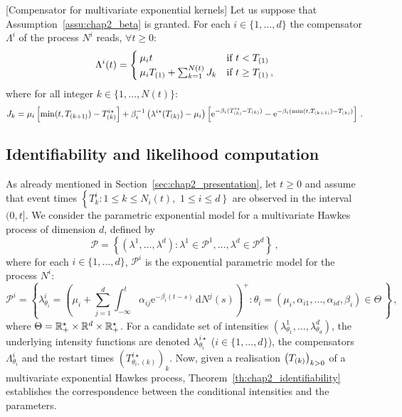    \begin{proposition}\label{prop:chap2_compensator}[Compensator for multivariate exponential kernels]
    Let us suppose that Assumption~\ref{assu:chap2_beta} is granted. For each $i\in\{1,\ldots, d\}$ the compensator $\Lambda^i$ of the process $N^i$ reads, $\forall t\geq 0$:
    \begin{equation}\label{eq:chap2_compensator_exponential}
      \Lambda^i(t) =
      \begin{cases}
        \mu_i t & \text{if } t < T\park[1] \\
        \mu_i T\park[1] + \sum_{k=1}^{N(t)} J_k & \text{if } t \geq T\park[1] \,,
      \end{cases}
    \end{equation}
    where for all integer \(k \in \{1, \dots, N(t)\}\):
    \begin{equation*}
      J_k =
      \mu_i \left[\min(t, T\park[k+1] ) - T\park^{i\star}\right] + \beta_i^{-1} \left(\lambda^{i\star}(T\park) - \mu_i \right)
      \left[ \mathrm{e}^{-\beta_i(T\park^{i\star} - T\park)} - \mathrm{e}^{-\beta_i(\min(t, T\park[k+1])- T\park)} \right]\,.
    \end{equation*}
    \end{proposition}
    
  \subsection{Identifiability and likelihood computation}\label{sec:chap2_likelihood}
    As already mentioned in Section~\ref{sec:chap2_presentation}, let \(t \ge 0\) and assume that event times
    $\left\{ T_k^i : 1 \le k \le N_i(t),\right.$ $\left. 1 \le i \le d \right\}$ are observed in the interval \((0, t]\).
    We consider the parametric exponential model for a multivariate Hawkes process of dimension $d$, defined by
    \[
      \mathcal P = \left\{(\lambda^1, \dots, \lambda^d)\colon \lambda^1 \in \mathcal P^1, \dots, \lambda^d \in \mathcal P^d \right\} \,,
    \]
    where for each \(i \in \{1, \dots, d\}\), \(\mathcal P^i\) is the exponential parametric model for the process \(N^i\):
\[
      \mathcal{P}^i
      = \left\{	\lambda_{\theta_i}^i = \left(\mu_i + \sum_{j=1}^{d}{\int_{-\infty}^{t}{\alpha_{ij} \mathrm{e}^{-\beta_i(t-s)}\,\mathrm{d}N^j(s)}}\right)^+ \colon \theta_i = (\mu_i, \alpha_{i1}, \ldots, \alpha_{id}, \beta_i) \in\Theta \,\right\}\,,
    \]
    where $\Theta = \RR_+^\star\times\RR^d\times\RR_+^\star$.
    For a candidate set of intensities \((\lambda_{\theta_1}^1, \dots, \lambda_{\theta_d}^d)\), the underlying intensity functions are denoted \(\lambda_{\theta_i}^{i\star}\) (\(i \in \{1, \dots, d\}\)), the compensators $\Lambda_{\theta_i}^i$
    and the restart times
    $(T^{i\star}_{\theta_i, (k)})_{k}$.
    Now, given a realisation $\left(T\park \right)_{k>0}$ of a multivariate exponential Hawkes process,
    Theorem~\ref{th:chap2_identifiability} establishes the correspondence between the conditional intensities and the parameters.
        
